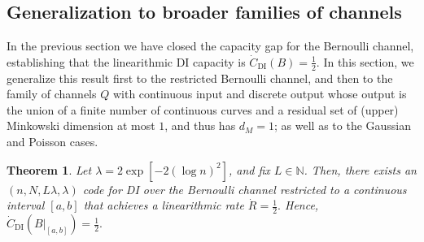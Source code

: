 \documentclass[10pt, conference]{IEEEtran}
\newtheorem{theorem}{Theorem}
\newcommand{\1}{\mathds{1}}
\newcommand{\NN}{\mathbb{N}}
\begin{document}
\subsection{Generalization to broader families of channels} \label{ssec:restricted_bern}

In the previous section we have closed the capacity gap for the Bernoulli channel, establishing that the linearithmic DI capacity is $\dot{C}_\text{DI}(B)=\frac12$. In this section, we generalize this result first to the restricted Bernoulli channel, and then to the family of channels $Q$ with continuous input and discrete output whose output is the union of a finite number of continuous 
curves and a residual set of (upper) Minkowski dimension at most $1$, and thus has $d_M=1$; as well as to the Gaussian and Poisson cases.

\begin{theorem}\label{thm:Restricted_Bernoulli}
Let $\lambda=2\exp\left[-2(\log n)^2\right]$, and fix $L\in \NN$. Then, there exists an $(n,N,L\lambda,\lambda)$ code for DI over the Bernoulli channel restricted to a continuous interval $[a,b]$ that achieves a linearithmic rate 
\(
\dot{R}=\frac{1}{2}.
\)
Hence, 
\(
\dot{C}_\text{DI}(B|_{[a,b]})=\frac12.
\)
\end{theorem}
\end{document}
